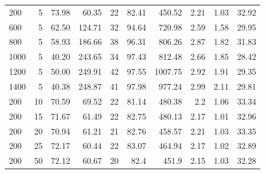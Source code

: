 \begin{table}[h]
{{\begin{tabular}{lrrrrrrrrr}
                \hline
                200        & 5                    & 73.98             & 60.35           & 22       & 82.41          & 450.52                     & 2.21      & 1.03              & 32.92                    \\
                600        & 5                    & 62.50             & 124.71          & 32       & 94.64          & 720.98                     & 2.59      & 1.58              & 29.95                    \\
                800        & 5                    & 58.93             & 186.66          & 38       & 96.31          & 806.26                     & 2.87      & 1.82              & 31.83                    \\
                1000       & 5                    & 40.20             & 243.65          & 34       & 97.43          & 812.48                     & 2.66      & 1.85              & 28.42                    \\
                1200       & 5                    & 50.00             & 249.91          & 42       & 97.55          & 1007.75                    & 2.92      & 1.91              & 29.35                    \\
                1400       & 5                    & 40.38             & 248.87          & 41       & 97.98          & 977.24                     & 2.99      & 2.11              & 29.81                    \\
                \hline
                200        & 10                   & 70.59             & 69.52           & 22       & 81.14          & 480.38                     & 2.2       & 1.06              & 33.34                    \\
                200        & 15                   & 71.67             & 61.49           & 22       & 82.75          & 480.13                     & 2.17      & 1.01              & 32.96                    \\
                200        & 20                   & 70.94             & 61.21           & 21       & 82.76          & 458.57                     & 2.21      & 1.03              & 33.35                    \\
                200        & 25                   & 72.17             & 60.44           & 22       & 83.07          & 464.94                     & 2.17      & 1.02              & 32.89                    \\
                \hline
                200        & 50                   & 72.12             & 60.67           & 20       & 82.4           & 451.9                      & 2.15      & 1.03              & 32.28                    \\

\end{tabular}}}
\end{table}

